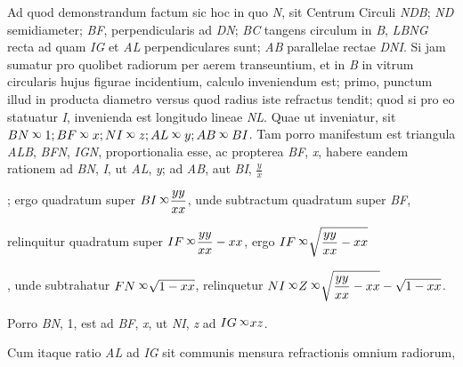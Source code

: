 \pstart[84 v\textsuperscript{o}] Ad quod demonstrandum factum sic hoc  in quo \textit{N}, sit Centrum Circuli \textit{NDB}; \textit{ND} semidiameter; \textit{BF}, perpendicularis ad \textit{DN}; \textit{BC} tangens circulum in \textit{B}, \textit{LBNG} recta ad quam \textit{IG} et \textit{AL} perpendiculares sunt; \textit{AB} parallelae rectae \textit{DNI}. Si jam  sumatur pro quolibet  radiorum per aerem transeuntium, et in \textit{B} in vitrum  circularis hujus figurae incidentium, calculo inveniendum  est; primo, punctum illud in producta diametro versus quod  radius iste refractus tendit; quod si pro eo statuatur \textit{I}, invenienda est longitudo lineae \textit{NL}. Quae ut inveniatur,  sit $BN\: ^{\rotatebox{180}{$\propto$}} \:1 ; BF\: ^{\rotatebox{180}{$\propto$}} \:x ; NI\: ^{\rotatebox{180}{$\propto$}}\: z ; AL\: ^{\rotatebox{180}{$\propto$}}\: y ; AB\: ^{\rotatebox{180}{$\propto$}}\: BI$.
Tam  porro manifestum est triangula \textit{ALB}, \textit{BFN}, \textit{IGN}, proportionalia esse, ac propterea \textit{BF}, \textit{x}, habere eandem rationem  ad \textit{BN}, \textit{I}, ut \textit{AL}, \textit{y}; ad \textit{AB}, aut \textit{BI}, $\displaystyle \frac{y}{x}$\rule[-4mm]{0mm}{10mm}; ergo quadratum  super $\displaystyle BI\: ^{\rotatebox{180}{$\propto$}}\frac{yy}{xx}$, unde subtractum quadratum super \textit{BF},\rule[-4mm]{0mm}{10mm} relinquitur quadratum super $\displaystyle IF \:^{\rotatebox{180}{$\propto$}}\frac{yy}{xx}-xx$, ergo $\displaystyle IF \:^{\rotatebox{180}{$\propto$}}\sqrt{\frac{yy}{xx}-xx}$\rule[-4mm]{0mm}{10mm}, unde subtrahatur $FN\: ^{\rotatebox{180}{$\propto$}}\sqrt{1-xx}$, relinquetur $\displaystyle NI \:^{\rotatebox{180}{$\propto$}}Z \:^{\rotatebox{180}{$\propto$}} \sqrt{\frac{yy}{xx}-xx}-\sqrt{1-xx}$.\rule[-4mm]{0mm}{10mm} Porro \textit{BN}, 1, est ad \textit{BF}, \textit{x}, ut \textit{NI}, \textit{z} ad $IG\: ^{\rotatebox{180}{$\propto$}} xz$. \rule[0mm]{0mm}{5mm} Cum itaque ratio \textit{AL} ad \textit{IG} sit communis mensura refractionis  omnium radiorum, 